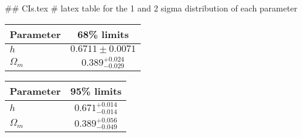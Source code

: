 ## CIs.tex
# latex table for the 1 and 2 sigma distribution of each parameter

\begin{tabular} { l  c}
 Parameter &  68\% limits\\
\hline
{\boldmath$h              $} & $0.6711\pm 0.0071          $\\
{\boldmath$\Omega_m       $} & $0.389^{+0.024}_{-0.029}   $\\
\hline
\end{tabular}

\begin{tabular} { l  c}
 Parameter &  95\% limits\\
\hline
{\boldmath$h              $} & $0.671^{+0.014}_{-0.014}   $\\
{\boldmath$\Omega_m       $} & $0.389^{+0.056}_{-0.049}   $\\
\hline
\end{tabular}
